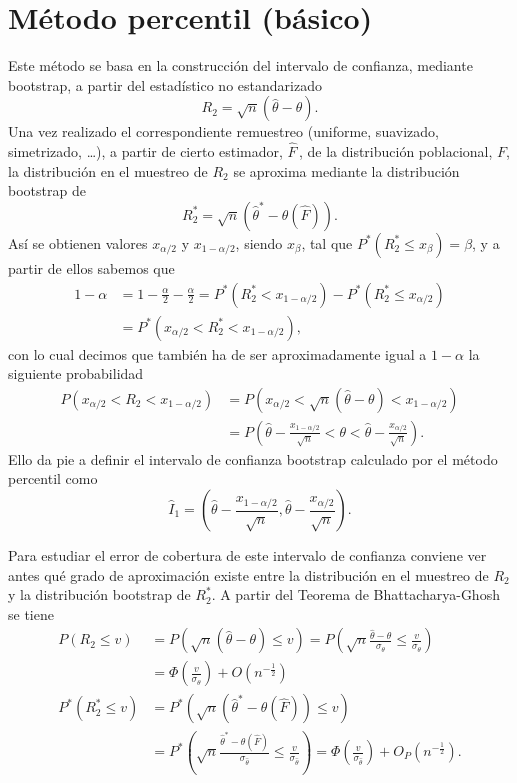\documentclass[]{book}
\theoremstyle{definition}
\theoremstyle{definition}
\theoremstyle{definition}
\theoremstyle{remark}
\begin{document}
\section{Método percentil (básico)}\label{metodo-percentil-basico}

Este método se basa en la construcción del intervalo de confianza,
mediante bootstrap, a partir del estadístico no estandarizado
\[R_2=\sqrt{n}\left( \hat{\theta}-\theta \right).\] Una vez realizado el
correspondiente remuestreo (uniforme, suavizado, simetrizado, \ldots{}),
a partir de cierto estimador, \(\hat{F}\,\), de la distribución
poblacional, \(F\), la distribución en el muestreo de \(R_2\) se
aproxima mediante la distribución bootstrap de
\[R_2^{\ast}=\sqrt{n}\left( \hat{\theta}^{\ast}-\theta \left( \hat{F}
 \right) \right).\] Así se obtienen valores \(x_{\alpha /2}\) y
\(x_{1-\alpha /2}\), siendo \(x_{\beta }\), tal que
\(P^{\ast}\left( R_2^{\ast }\leq x_{\beta } \right) =\beta\), y a partir
de ellos sabemos que \[\begin{aligned}
1-\alpha &= 1-\frac{\alpha }{2}-\frac{\alpha }{2}=P^{\ast}\left(
R_2^{\ast}<x_{1-\alpha /2} \right) -P^{\ast}\left( R_2^{\ast}\leq
x_{\alpha /2} \right) \\
&= P^{\ast}\left( x_{\alpha /2}<R_2^{\ast}<x_{1-\alpha /2} \right),
\end{aligned}\] con lo cual decimos que también ha de ser
aproximadamente igual a \(1-\alpha\) la siguiente
probabilidad\[\begin{aligned}
P\left( x_{\alpha /2}<R_2<x_{1-\alpha /2} \right) &= P\left( x_{\alpha /2}<
\sqrt{n}\left( \hat{\theta}-\theta \right) <x_{1-\alpha /2} \right) \\
&= P\left( \hat{\theta}-\frac{x_{1-\alpha /2}}{\sqrt{n}}<\theta <\hat{\theta}
-\frac{x_{\alpha /2}}{\sqrt{n}} \right).\end{aligned}\] Ello da pie a
definir el intervalo de confianza bootstrap calculado por el método
percentil como
\[\hat{I}_1=\left( \hat{\theta}-\frac{x_{1-\alpha /2}}{\sqrt{n}},\hat{\theta}
-\frac{x_{\alpha /2}}{\sqrt{n}} \right).\]

Para estudiar el error de cobertura de este intervalo de confianza
conviene ver antes qué grado de aproximación existe entre la
distribución en el muestreo de \(R_2\) y la distribución bootstrap de
\(R_2^{\ast}\). A partir del Teorema de Bhattacharya-Ghosh se
tiene\[\begin{aligned}
P\left( R_2\leq v \right) &= P\left( \sqrt{n}\left( \hat{\theta}-\theta
 \right) \leq v \right) =P\left( \sqrt{n}\frac{\hat{\theta}-\theta }{\sigma
_{\theta }}\leq \frac{v}{\sigma _{\theta }} \right) \\
&= \Phi \left( \frac{v}{\sigma _{\theta }} \right) +O\left( n^{-\frac{1}{2}
} \right) \\
P^{\ast}\left( R_2^{\ast}\leq v \right) &= P^{\ast}\left( \sqrt{n}\left( 
\hat{\theta}^{\ast}-\theta \left( \hat{F} \right) \right) \leq v \right)
\\
&=  P^{\ast}\left( \sqrt{n}\frac{\hat{\theta}^{\ast}-\theta \left( \hat{F}
 \right)}{\sigma _{\hat{\theta}}}\leq \frac{v}{\sigma _{\hat{\theta}}} \right)
=\Phi \left( \frac{v}{\sigma _{\hat{\theta}}} \right) +O_{P}\left( n^{-
\frac{1}{2}} \right).
\end{aligned}\]
\end{document}
